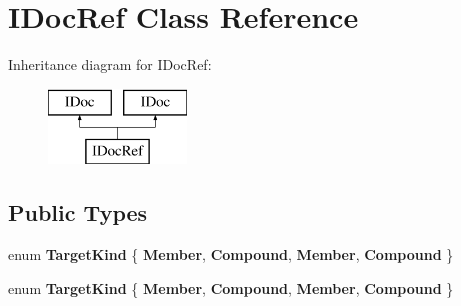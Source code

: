\hypertarget{class_i_doc_ref}{}\section{I\+Doc\+Ref Class Reference}
\label{class_i_doc_ref}
Inheritance diagram for I\+Doc\+Ref\+:\begin{figure}[H]
\begin{center}
\leavevmode
\includegraphics[height=2.000000cm]{class_i_doc_ref}
\end{center}
\end{figure}
\subsection*{Public Types}
\begin{DoxyCompactItemize}
\item 
\mbox{\label{class_i_doc_ref_af94834302f9f23860d170dc0a8529c08}} 
enum {\bfseries Target\+Kind} \{ {\bfseries Member}, 
{\bfseries Compound}, 
{\bfseries Member}, 
{\bfseries Compound}
 \}
\item 
\mbox{\label{class_i_doc_ref_af94834302f9f23860d170dc0a8529c08}} 
enum {\bfseries Target\+Kind} \{ {\bfseries Member}, 
{\bfseries Compound}, 
{\bfseries Member}, 
{\bfseries Compound}
 \}
\end{DoxyCompactItemize}
